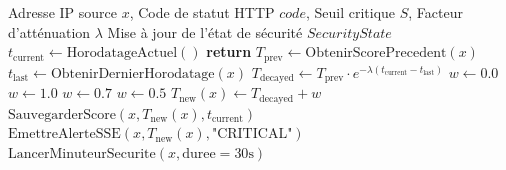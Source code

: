 \begin{algorithm}[!htbp]
\caption{Évaluation du score dynamique de menace $T_{decay}(x, t)$ et gestion du blocage applicatif}
\label{alg:threat_response}
\begin{algorithmic}[1]
\Require Adresse IP source $x$, Code de statut HTTP $code$, Seuil critique $S$, Facteur d'atténuation $\lambda$
\Ensure Mise à jour de l'état de sécurité $SecurityState$
\State $t_{\text{current}} \gets \text{HorodatageActuel}()$
    \State \textbf{return} 
\EndIf
\State $T_{\text{prev}} \gets \text{ObtenirScorePrecedent}(x)$
\State $t_{\text{last}} \gets \text{ObtenirDernierHorodatage}(x)$
\State $T_{\text{decayed}} \gets T_{\text{prev}} \cdot e^{-\lambda (t_{\text{current}} - t_{\text{last}})}$ 
\State $w \gets 0.0$
    \State $w \gets 1.0$ 
    \State $w \gets 0.7$ 
    \State $w \gets 0.5$ 
\EndIf
\State $T_{\text{new}}(x) \gets T_{\text{decayed}} + w$
\State $\text{SauvegarderScore}(x, T_{\text{new}}(x), t_{\text{current}})$
    \State $\text{EmettreAlerteSSE}(x, T_{\text{new}}(x), \text{"CRITICAL"})$
    \State $\text{LancerMinuteurSecurite}(x, \text{duree} = 30\text{s})$
\EndIf
\end{algorithmic}
\end{algorithm}


